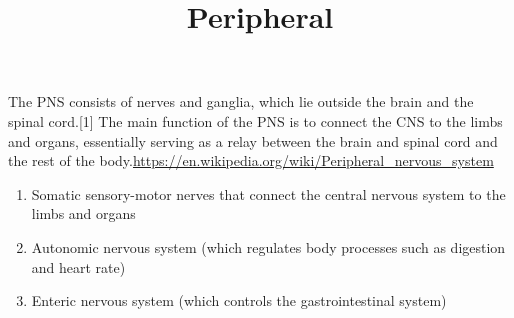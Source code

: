 \documentclass[a4paper]{article}
\title{Peripheral}
\date{}
\begin{document}
    \maketitle
    
    The PNS consists of nerves and ganglia, which lie outside the brain and the spinal cord.[1] The main function of the PNS is to connect the CNS to the limbs and organs, essentially serving as a relay between the brain and spinal cord and the rest of the body.\url{https://en.wikipedia.org/wiki/Peripheral_nervous_system}
    \begin{enumerate}
        \item Somatic sensory-motor nerves that connect the central nervous system to the limbs and organs
        \item Autonomic nervous system (which regulates body processes such as digestion and heart rate)
        \item Enteric nervous system (which controls the gastrointestinal system)
    \end{enumerate}
\end{document}
